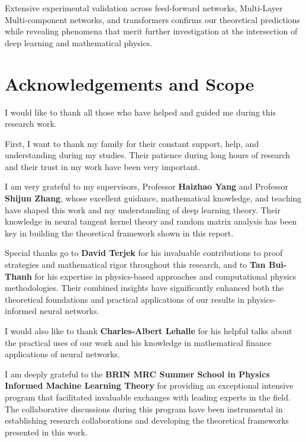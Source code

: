 \documentclass[a4paper]{article}
\theoremstyle{plain}
\theoremstyle{definition}
\theoremstyle{remark}
\begin{document}
Extensive experimental validation across feed-forward networks, Multi-Layer Multi-component networks, and transformers confirms our theoretical predictions while revealing phenomena that merit further investigation at the intersection of deep learning and mathematical physics.












\newpage
{}
\section*{Acknowledgements and Scope}


I would like to thank all those who have helped and guided me during this research work.

First, I want to thank my family for their constant support, help, and understanding during my studies. Their patience during long hours of research and their trust in my work have been very important.

I am very grateful to my supervisors, Professor \textbf{Haizhao Yang} and Professor \textbf{Shijun Zhang}, whose excellent guidance, mathematical knowledge, and teaching have shaped this work and my understanding of deep learning theory. Their knowledge in neural tangent kernel theory and random matrix analysis has been key in building the theoretical framework shown in this report.

Special thanks go to \textbf{David Terjek} for his invaluable contributions to proof strategies and mathematical rigor throughout this research, and to \textbf{Tan Bui-Thanh} for his expertise in physics-based approaches and computational physics methodologies. Their combined insights have significantly enhanced both the theoretical foundations and practical applications of our results in physics-informed neural networks.

I would also like to thank \textbf{Charles-Albert Lehalle} for his helpful talks about the practical uses of our work and his knowledge in mathematical finance applications of neural networks.

I am deeply grateful to the \textbf{BRIN MRC Summer School in Physics Informed Machine Learning Theory} for providing an exceptional intensive program that facilitated invaluable exchanges with leading experts in the field. The collaborative discussions during this program have been instrumental in establishing research collaborations and developing the theoretical frameworks presented in this work.
\end{document}
